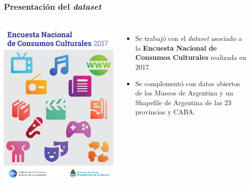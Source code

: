 \documentclass[10pt]{beamer}
\begin{document}
\begin{frame}
  \frametitle{Presentación del \textit{dataset}}

  \begin{columns}
      \begin{center}
        \includegraphics[height=0.7\textheight]{encc_informe_portada.pdf}
      \end{center}

      \begin{itemize}
        \item Se trabajó con el \textit{dataset} asociado a la \textbf{Encuesta Nacional de Consumos Culturales} realizada en 2017. 
        \item Se complementó con datos abiertos de los Museos de Argentina y un Shapefile de Argentina de las 23 provincias y CABA.
      \end{itemize}
  \end{columns}
\end{frame}
\end{document}
